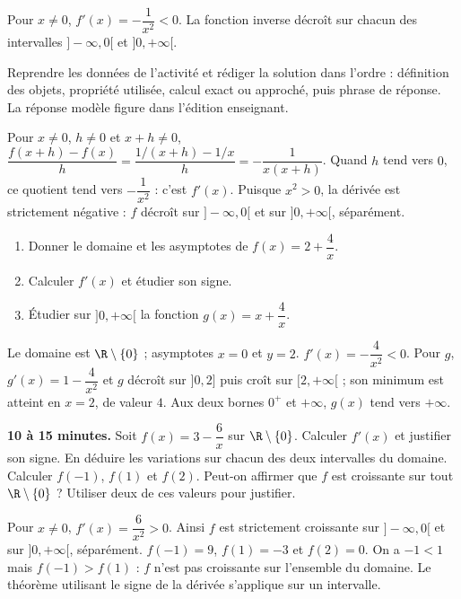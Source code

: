 \begin{summary}Pour $x\neq0$, $f'(x)=-\dfrac1{x^2}<0$. La fonction inverse décroît sur chacun des intervalles $]-\infty,0[$ et $]0,+\infty[$.\end{summary}

\begin{example}
Reprendre les données de l'activité et rédiger la solution dans l'ordre : définition des objets, propriété utilisée, calcul exact ou approché, puis phrase de réponse. La réponse modèle figure dans l'édition enseignant.
\end{example}
\begin{solution}Pour $x\neq0$, $h\neq0$ et $x+h\neq0$, $\dfrac{f(x+h)-f(x)}h=\dfrac{1/(x+h)-1/x}{h}=-\dfrac1{x(x+h)}$. Quand $h$ tend vers $0$, ce quotient tend vers $-\dfrac1{x^2}$ : c'est $f'(x)$. Puisque $x^2>0$, la dérivée est strictement négative : $f$ décroît sur $]-\infty,0[$ et sur $]0,+\infty[$, séparément.\end{solution}

\begin{exercise}[essentiel]
\begin{enumerate}\item Donner le domaine et les asymptotes de $f(x)=2+\dfrac{4}x$.\item Calculer $f'(x)$ et étudier son signe.\item Étudier sur $]0,+\infty[$ la fonction $g(x)=x+\dfrac{4}x$.\end{enumerate}
\end{exercise}
\begin{solution}Le domaine est $\R\setminus\{0\}$ ; asymptotes $x=0$ et $y=2$. $f'(x)=-\dfrac{4}{x^2}<0$. Pour $g$, $g'(x)=1-\dfrac{4}{x^2}$ et $g$ décroît sur $]0,2]$ puis croît sur $[2,+\infty[$ ; son minimum est atteint en $x=2$, de valeur $4$. Aux deux bornes $0^+$ et $+\infty$, $g(x)$ tend vers $+\infty$.\end{solution}


\begin{homework}\textbf{10 à 15 minutes.} Soit $f(x)=3-\dfrac6x$ sur $\R\setminus\{0\}$. Calculer $f'(x)$ et justifier son signe. En déduire les variations sur chacun des deux intervalles du domaine. Calculer $f(-1)$, $f(1)$ et $f(2)$. Peut-on affirmer que $f$ est croissante sur tout $\R\setminus\{0\}$ ? Utiliser deux de ces valeurs pour justifier.\end{homework}
\begin{solution}Pour $x\neq0$, $f'(x)=\dfrac6{x^2}>0$. Ainsi $f$ est strictement croissante sur $]-\infty,0[$ et sur $]0,+\infty[$, séparément. $f(-1)=9$, $f(1)=-3$ et $f(2)=0$. On a $-1<1$ mais $f(-1)>f(1)$ : $f$ n'est pas croissante sur l'ensemble du domaine. Le théorème utilisant le signe de la dérivée s'applique sur un intervalle.\end{solution}

